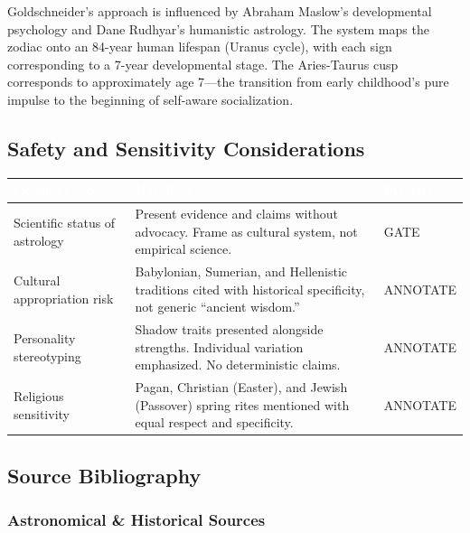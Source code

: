 \documentclass[11pt,letterpaper]{article}
\newcommand{\tableheader}[1]{\textbf{\sffamily\textcolor{white}{#1}}}
\begin{document}
Goldschneider's approach is influenced by Abraham Maslow's developmental psychology and Dane Rudhyar's humanistic astrology. The system maps the zodiac onto an 84-year human lifespan (Uranus cycle), with each sign corresponding to a 7-year developmental stage. The Aries-Taurus cusp corresponds to approximately age 7---the transition from early childhood's pure impulse to the beginning of self-aware socialization.

\subsection{Safety and Sensitivity Considerations}

\begin{center}
\begin{tabularx}{\textwidth}{L{3.5cm}XC{2cm}}
\toprule
{}
\tableheader{Consideration} & \tableheader{Handling} & \tableheader{Priority} \\
\midrule
Scientific status of astrology & Present evidence and claims without advocacy. Frame as cultural system, not empirical science. & GATE \\
Cultural appropriation risk & Babylonian, Sumerian, and Hellenistic traditions cited with historical specificity, not generic ``ancient wisdom.'' & ANNOTATE \\
Personality stereotyping & Shadow traits presented alongside strengths. Individual variation emphasized. No deterministic claims. & ANNOTATE \\
Religious sensitivity & Pagan, Christian (Easter), and Jewish (Passover) spring rites mentioned with equal respect and specificity. & ANNOTATE \\
\bottomrule
\end{tabularx}
\end{center}

\subsection{Source Bibliography}

\subsubsection{Astronomical \& Historical Sources}
\end{document}

